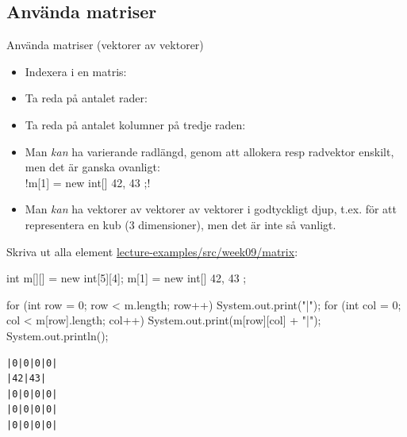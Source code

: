 \documentclass{lecturenotes}
\begin{document}
\subsection{Använda matriser}
\begin{Slide}{Använda matriser (vektorer av vektorer)}\footnotesize
\begin{itemize}
\item Indexera i en matris: \\ \vspace{1em}
\item Ta reda på antalet rader: \\ 
\item Ta reda på antalet kolumner på tredje raden: \\  
\item Man \emph{kan} ha varierande radlängd, genom att allokera resp radvektor enskilt, men det är ganska ovanligt: \\ 
   \code!m[1] = new int[] { 42, 43 };! 
\item Man \emph{kan} ha vektorer av vektorer av vektorer i godtyckligt djup, t.ex. för att representera en kub (3 dimensioner), men det är inte så vanligt. 
\end{itemize}
\end{Slide}

\begin{Slide}{Skriva ut alla element}
\footnotesize\href{https://github.com/bjornregnell/lth-eda016-2015/tree/master/lectures/examples/eclipse-ws/lecture-examples/src/week09}{lecture-examples/src/week09/matrix}:
\begin{Code}[numberstyle=,numbers=left]
        int m[][] = new int[5][4];
        m[1] = new int[] { 42, 43 };

        for (int row = 0; row < m.length; row++) {
            System.out.print("|");
            for (int col = 0; col < m[row].length; col++) {
                System.out.print(m[row][col] + "|");
            }
            System.out.println();
        }
\end{Code}
\begin{verbatim}
|0|0|0|0|
|42|43|
|0|0|0|0|
|0|0|0|0|
|0|0|0|0|
\end{verbatim}
\end{Slide}
\end{document}
